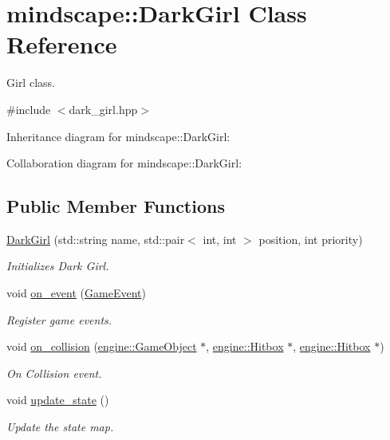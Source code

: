 \hypertarget{classmindscape_1_1_dark_girl}{}\section{mindscape\+:\+:Dark\+Girl Class Reference}
\label{classmindscape_1_1_dark_girl}


Girl class.  




{\ttfamily \#include $<$dark\+\_\+girl.\+hpp$>$}



Inheritance diagram for mindscape\+:\+:Dark\+Girl\+:


Collaboration diagram for mindscape\+:\+:Dark\+Girl\+:
\subsection*{Public Member Functions}
\begin{DoxyCompactItemize}
\item 
\hyperlink{classmindscape_1_1_dark_girl_a8706a5025f46ae898987f25f775917b3}{Dark\+Girl} (std\+::string name, std\+::pair$<$ int, int $>$ position, int priority)
\begin{DoxyCompactList}\small\item\em Initializes Dark Girl. \end{DoxyCompactList}\item 
void \hyperlink{classmindscape_1_1_dark_girl_ae9c166c0c5eb205a7e47ce5244d37ab0}{on\+\_\+event} (\hyperlink{class_game_event}{Game\+Event})
\begin{DoxyCompactList}\small\item\em Register game events. \end{DoxyCompactList}\item 
void \hyperlink{classmindscape_1_1_dark_girl_a594b92edd6c401bb890ef5972fe15390}{on\+\_\+collision} (\hyperlink{classengine_1_1_game_object}{engine\+::\+Game\+Object} $\ast$, \hyperlink{classengine_1_1_hitbox}{engine\+::\+Hitbox} $\ast$, \hyperlink{classengine_1_1_hitbox}{engine\+::\+Hitbox} $\ast$)
\begin{DoxyCompactList}\small\item\em On Collision event. \end{DoxyCompactList}\item 
void \hyperlink{classmindscape_1_1_dark_girl_a8575c2baaa6c883f76224b84847d1f2a}{update\+\_\+state} ()
\begin{DoxyCompactList}\small\item\em Update the state map. \end{DoxyCompactList}\end{DoxyCompactItemize}
